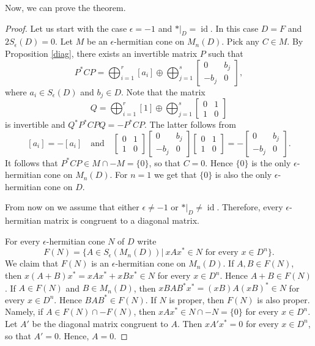 \documentclass[12pt,reqno]{amsart}
\theoremstyle{definition}
\providecommand{\eps}{\epsilon}
\DeclareMathOperator{\id}{id}
\begin{document}
Now, we can prove the theorem.

\begin{proof}
Let us start with the case $\eps=-1$ and $\ast|_D = \id$. In this case $D=F$ and $2S_\eps(D)=0$.
Let $M$ be an $\eps$-hermitian cone on $M_n(D)$. Pick any $C \in M$. By Proposition \ref{diag},
there exists an invertible matrix $P$ such that 
\[
P^\ast C P = \bigoplus_{i=1}^r [a_i] \oplus \bigoplus_{j=1}^s 
\left[ \begin{array}{cc}0 & b_j \\ -b_j & 0 \end{array} \right],
\]
where $a_i \in S_\eps(D)$ and $b_j \in D$. Note that the matrix
\[
Q = \bigoplus_{i=1}^r [1] \oplus \bigoplus_{j=1}^s 
\left[ \begin{array}{cc}0 & 1 \\ 1 & 0 \end{array} \right]
\]
is invertible and $Q^\ast P^\ast C P Q=-P^\ast C  P$. The latter follows from
\[
[a_i] = -[a_i] \quad \mbox{and} \quad
\left[ \begin{array}{cc}0 & 1 \\ 1 & 0 \end{array} \right]
\left[ \begin{array}{cc}0 & b_j \\ -b_j & 0 \end{array} \right]
\left[ \begin{array}{cc}0 & 1 \\ 1 & 0 \end{array} \right] =
- \left[ \begin{array}{cc}0 & b_j \\ -b_j & 0 \end{array} \right].
\]
It follows that $P^\ast C P \in M \cap -M =\{0\}$, so that $C=0$. Hence
$\{0\}$ is the only $\eps$-hermitian cone on $M_n(D)$. For $n=1$ we get
that $\{0\}$ is also the only $\eps$-hermitian cone on $D$.

From now on we assume that either $\eps \ne -1$ or $\ast|_D \ne \id$. Therefore,
every $\eps$-hermitian matrix is congruent to a diagonal matrix.

For every $\eps$-hermitian cone $N$ of $D$ write
\[ 
F(N) = \{A \in S_\eps(M_n(D)) \vert \ x A x^\ast \in N \text{ for every } x \in D^n\}.
\]
We claim that $F(N)$ is an $\eps$-hermitian cone on $M_n(D)$. If $A,B \in F(N)$, then
$x(A+B)x^\ast = xAx^\ast+xBx^\ast \in N$ for every $x \in D^n$. Hence $A+B \in F(N)$.
If $A \in F(N)$ and $B \in M_n(D)$, then $xBAB^\ast x^\ast =(xB)A(xB)^\ast \in N$
for every $x \in D^n$. Hence $BAB^\ast \in F(N)$. If $N$ is proper, then $F(N)$ is also
proper. Namely, if $A \in F(N) \cap -F(N)$, then $xAx^\ast \in N \cap -N = \{0\}$ for 
every $x \in D^n$. Let $A'$ be the diagonal matrix congruent to $A$. Then $xA'x^\ast=0$
for every $x \in D^n$, so that $A'=0$. Hence, $A=0$.


\end{proof}
\end{document}
